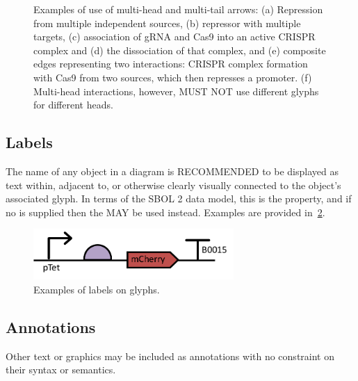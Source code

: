 \begin{enumerate}
\begin{figure}[h!]
	\caption{Examples of use of multi-head and multi-tail arrows: 
	(a) Repression from multiple independent sources, (b) repressor with multiple targets, 
	(c) association of gRNA and Cas9 into an active CRISPR complex and (d) the dissociation of that complex, and
	(e) composite edges representing two interactions: CRISPR complex formation with Cas9 from two sources, which then represses a promoter.
	(f) Multi-head interactions, however, MUST NOT use different glyphs for different heads.}
	\label{exa:4d}
	\end{figure}

\end{enumerate}

\subsection{Labels}
The name of any object in a diagram is RECOMMENDED to be displayed as text within, adjacent to, or otherwise clearly visually connected to the object's associated glyph.  In terms of the SBOL 2 data model, this is the  property, and if no  is supplied then the  MAY be used instead.
Examples are provided in~\ref{exa:5}.

	\begin{figure}[h!]
	\centering
	\includegraphics[width=3in]{figures/examples/5-labels.pdf}
	\caption{Examples of labels on glyphs.}
	\label{exa:5}
	\end{figure}


\subsection{Annotations}
Other text or graphics may be included as annotations with no constraint on their syntax or semantics.

